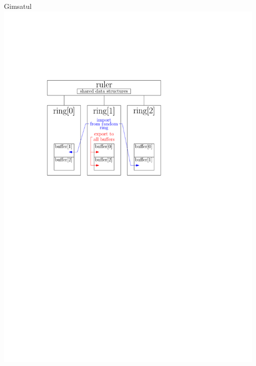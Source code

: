 \documentclass{beamer}
\begin{document}
\begin{frame}{Gimsatul}
    \center
    \includegraphics[scale=.8]{figures/gimsatul_architecture.pdf}
\end{frame}
\end{document}
